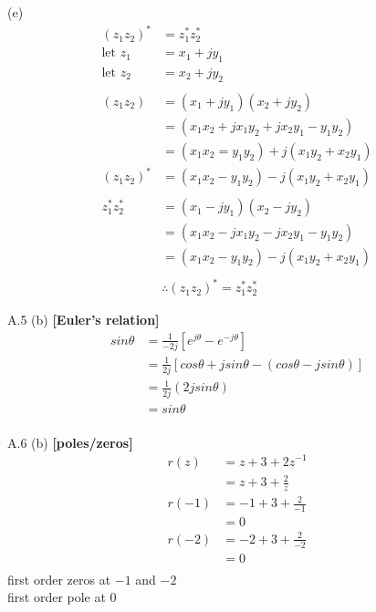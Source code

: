 \documentclass{article}
\begin{document}
(e)
\begin{equation*}
\begin{split}
   (z_1 z_2)^* &= z_1^*z_2^*\\
   \text{let } z_1 &= x_1 + jy_1\\
   \text{let } z_2 &= x_2 + jy_2\\\\
   (z_1z_2) &= (x_1 + jy_1)(x_2 + jy_2)\\
   &= (x_1x_2 + jx_1y_2 + jx_2y_1 - y_1y_2)\\
   &= (x_1x_2 = y_1y_2) + j(x_1y_2 + x_2y_1)\\
   (z_1z_2)^* &= (x_1x_2- y_1y_2) - j(x_1y_2 + x_2y_1)\\\\
   z_1^*z_2^* &= (x_1 - jy_1)(x_2 - jy_2)\\
   &= (x_1x_2 - jx_1y_2 - jx_2y_1 - y_1y_2)\\
   &= (x_1x_2 - y_1y_2) - j(x_1y_2 + x_2y_1)\\\\
   & \therefore (z_1z_2)^* = z_1^*z_2^*
\end{split}
\end{equation*} 


A.5 (b) {\bf [Euler's relation]}\\

\begin{equation*}
\begin{split}
    sin\theta &= \frac{1}{-2j}[e^{j\theta}-e^{-j\theta}]\\
    &= \frac{1}{2j}[cos\theta + jsin\theta - (cos\theta - jsin\theta)]\\
    &= \frac{1}{2j}(2jsin\theta)\\
    &= sin\theta\\
\end{split}
\end{equation*}

A.6 (b) {\bf [poles/zeros]}\\

\begin{equation*}
\begin{split}
    r(z) &= z + 3 + 2z^{-1}\\
    &= z + 3 + \frac{2}{z}\\
    r(-1) &= -1 + 3 + \frac{2}{-1}\\
    &= 0\\
    r(-2) &= -2 + 3 + \frac{2}{-2}\\
    &= 0\\
\end{split}
\end{equation*}
first order zeros at $-1$ and $-2$\\
first order pole at $0$\\
\end{document}
